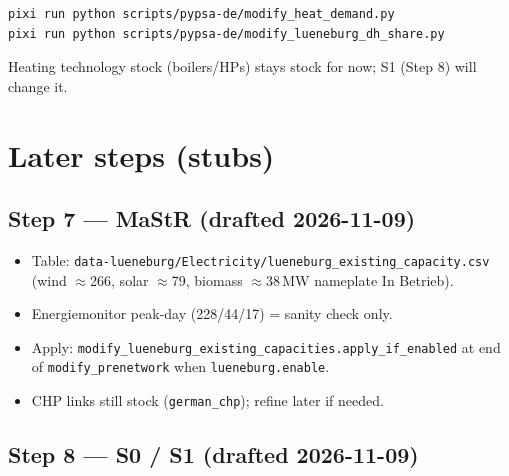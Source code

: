 \documentclass[11pt,a4paper]{article}
\begin{document}
\begin{lstlisting}
pixi run python scripts/pypsa-de/modify_heat_demand.py
pixi run python scripts/pypsa-de/modify_lueneburg_dh_share.py
\end{lstlisting}

Heating technology stock (boilers/HPs) stays stock for now; S1 (Step 8) will change it.

\section{Later steps (stubs)}

\subsection{Step 7 --- MaStR (drafted 2026-11-09)}

\noindent{}

\begin{itemize}[leftmargin=*]
  \item Table: \texttt{data-lueneburg/Electricity/lueneburg\_existing\_capacity.csv}
        (wind $\approx$266, solar $\approx$79, biomass $\approx$38\,MW nameplate In Betrieb).
  \item Energiemonitor peak-day (228/44/17) = sanity check only.
  \item Apply: \texttt{modify\_lueneburg\_existing\_capacities.apply\_if\_enabled}
        at end of \texttt{modify\_prenetwork} when \texttt{lueneburg.enable}.
  \item CHP links still stock (\texttt{german\_chp}); refine later if needed.
\end{itemize}

\subsection{Step 8 --- S0 / S1 (drafted 2026-11-09)}

\noindent{}
\end{document}
